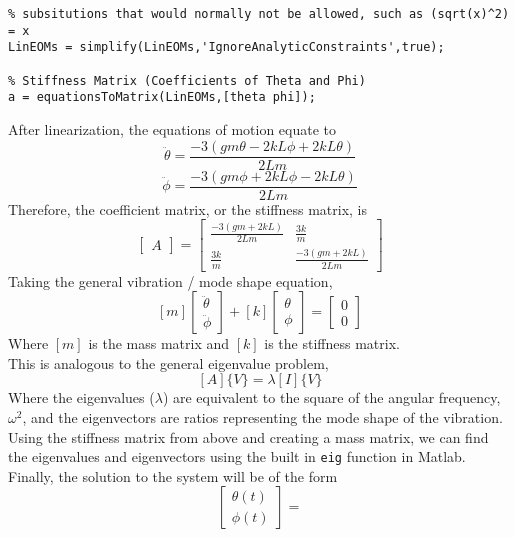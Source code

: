 \documentclass[12pt]{report}
\begin{document}
\begin{flushleft}
\begin{lstlisting}[frame=lines,style=Matlab-editor,basicstyle = \mlttfamily]
% The Ignore Analytic Constraints argument allows MATLAB to make certain
% subsitutions that would normally not be allowed, such as (sqrt(x)^2) = x
LinEOMs = simplify(LinEOMs,'IgnoreAnalyticConstraints',true);

% Stiffness Matrix (Coefficients of Theta and Phi)
a = equationsToMatrix(LinEOMs,[theta phi]);
\end{lstlisting}

After linearization, the equations of motion equate to
\begin{equation}
\ddot{\theta} = \frac{-3\left(gm\theta - 2kL\phi + 2kL\theta\right)}{2Lm}
\end{equation}
\begin{equation}
\ddot{\phi} = \frac{-3\left(gm\phi + 2kL\phi - 2kL\theta\right)}{2Lm}
\end{equation}
Therefore, the coefficient matrix, or the stiffness matrix, is
$$
\begin{bmatrix} A \end{bmatrix} =
\begin{bmatrix}
\frac{-3(gm + 2kL)}{2Lm} & \frac{3k}{m} \\
\frac{3k}{m} & \frac{-3(gm + 2kL)}{2Lm}
\end{bmatrix}
$$
Taking the general vibration / mode shape equation,
$$[m] \begin{bmatrix} \ddot{\theta}\\ \ddot{\phi} \end{bmatrix} +
[k] \begin{bmatrix} \theta \\ \phi \end{bmatrix} =
\begin{bmatrix} 0\\ 0 \end{bmatrix}$$
Where $[m]$ is the mass matrix and $[k]$ is the stiffness matrix. \\
This is analogous to the general eigenvalue problem,
$$
[A]\{V\} = \lambda[I]\{V\}
$$
Where the eigenvalues ($\lambda$) are equivalent to the square of the angular frequency,
$\omega^2$, and the eigenvectors are ratios representing the mode shape of the
 vibration. \\
Using the stiffness matrix from above and creating a mass matrix, we can find the
eigenvalues and eigenvectors using the built in \lstinline[style=Matlab-editor]!eig!
 function in Matlab. \\
Finally, the solution to the system will be of the form
$$
\begin{bmatrix} \theta(t)\\ \phi(t) \end{bmatrix} =
$$
\end{flushleft}
\end{document}
